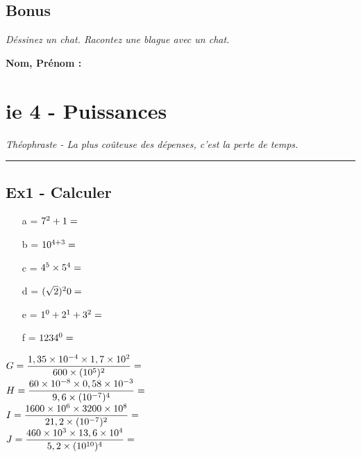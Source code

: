 \documentclass[12pt]{article}
\newcommand{\horrule}[1]{\rule{\linewidth}{#1}} %
\newcommand{\Pointilles}[1]{%
  \par\nobreak
  \noindent\rule{0pt}{1.5\baselineskip}%
  \multido{}{#1}{\noindent\makebox[\linewidth]{\dotfill}\endgraf}%
  \bigskip%
}
\begin{document}
\Pointilles{20}

\subsection*{Bonus}

\textit{Déssinez un chat. Racontez une blague avec un chat.}


%
%

\newpage

%
%
\textbf{Nom, Prénom : }

\section*{ie 4 - Puissances}
\begin{center}
  \textit{Théophraste - La plus coûteuse des dépenses, c’est la perte de temps.}
\end{center}
\horrule{2px}

\subsection*{Ex1 - Calculer}

\begin{multicols}{3}
  \begin{itemize}
  \item[a =] $7^2 + 1 =  \dotfill $
  \item[b =] $10^{4+3} =  \dotfill $
  \item[c =] $4^5 \times 5^4 =  \dotfill $
  \item[d =] $(\sqrt{2})^20 =  \dotfill $
  \item[e =] $1^0 + 2^1 + 3^2 =  \dotfill $
  \item[f =] $1234^0 =  \dotfill $
  \end{itemize}

\end{multicols}

\begin{multicols}{2}

  $G = \dfrac{1,35 \times 10^{-4} \times 1,7 \times 10^{2}}{600 \times (10^5)^2} =  \dotfill $\\
  $H = \dfrac{60 \times 10^{-8} \times 0,58 \times 10^{-3}}{9,6 \times (10^{-7})^4} =  \dotfill $ \\
  $I = \dfrac{1600 \times 10^{6} \times 3200 \times 10^{8}}{21,2 \times (10^{-7})^2} =  \dotfill $\\
  $J = \dfrac{460 \times 10^{3} \times 13,6 \times 10^{4}}{5,2 \times (10^{10})^4} =  \dotfill $ 

\end{multicols}
\end{document}
